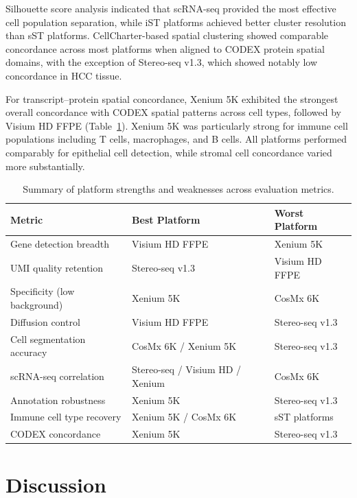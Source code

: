 \documentclass[11pt]{article}
\begin{document}
Silhouette score analysis indicated that scRNA-seq provided the most effective cell population separation, while iST platforms achieved better cluster resolution than sST platforms. CellCharter-based spatial clustering showed comparable concordance across most platforms when aligned to CODEX protein spatial domains, with the exception of Stereo-seq v1.3, which showed notably low concordance in HCC tissue.

For transcript--protein spatial concordance, Xenium 5K exhibited the strongest overall concordance with CODEX spatial patterns across cell types, followed by Visium HD FFPE (Table~\ref{tab:codex}). Xenium 5K was particularly strong for immune cell populations including T cells, macrophages, and B cells. All platforms performed comparably for epithelial cell detection, while stromal cell concordance varied more substantially.

\begin{table}[ht]
\centering
\caption{Summary of platform strengths and weaknesses across evaluation metrics.}
\label{tab:codex}
\begin{tabular}{@{}lll@{}}
\toprule
Metric & Best Platform & Worst Platform \\
\midrule
Gene detection breadth & Visium HD FFPE & Xenium 5K \\
UMI quality retention & Stereo-seq v1.3 & Visium HD FFPE \\
Specificity (low background) & Xenium 5K & CosMx 6K \\
Diffusion control & Visium HD FFPE & Stereo-seq v1.3 \\
Cell segmentation accuracy & CosMx 6K / Xenium 5K & Stereo-seq v1.3 \\
scRNA-seq correlation & Stereo-seq / Visium HD / Xenium & CosMx 6K \\
Annotation robustness & Xenium 5K & Stereo-seq v1.3 \\
Immune cell type recovery & Xenium 5K / CosMx 6K & sST platforms \\
CODEX concordance & Xenium 5K & Stereo-seq v1.3 \\
\bottomrule
\end{tabular}
\end{table}

\section{Discussion}
\end{document}
